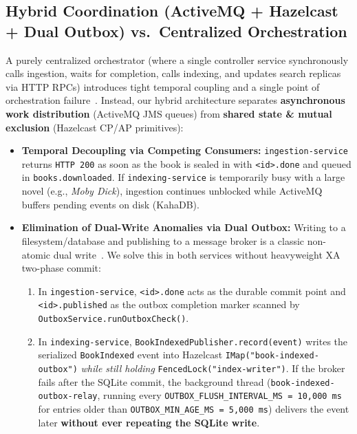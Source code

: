 \documentclass[10pt,a4paper]{article}
\begin{document}
\subsection{Hybrid Coordination (ActiveMQ + Hazelcast + Dual Outbox) vs.\ Centralized Orchestration}
A purely centralized orchestrator (where a single controller service synchronously calls ingestion, waits for completion, calls indexing, and updates search replicas via HTTP RPCs) introduces tight temporal coupling and a single point of orchestration failure~\cite{microservices_richardson}. Instead, our hybrid architecture separates \textbf{asynchronous work distribution} (ActiveMQ JMS queues) from \textbf{shared state \& mutual exclusion} (Hazelcast CP/AP primitives):
\begin{itemize}[leftmargin=*,nosep]
    \item \textbf{Temporal Decoupling via Competing Consumers:} \texttt{ingestion-service} returns \texttt{HTTP 200} as soon as the book is sealed in  with \texttt{<id>.done} and queued in \texttt{books.downloaded}. If \texttt{indexing-service} is temporarily busy with a large novel (e.g., \emph{Moby Dick}), ingestion continues unblocked while ActiveMQ buffers pending events on disk (KahaDB).
    \item \textbf{Elimination of Dual-Write Anomalies via Dual Outbox:} Writing to a filesystem/database and publishing to a message broker is a classic non-atomic dual write~\cite{kleppmann_ddia}. We solve this in both services without heavyweight XA two-phase commit:
    \begin{enumerate}[nosep]
        \item In \texttt{ingestion-service}, \texttt{<id>.done} acts as the durable commit point and \texttt{<id>.published} as the outbox completion marker scanned by \texttt{OutboxService.runOutboxCheck()}.
        \item In \texttt{indexing-service}, \texttt{BookIndexedPublisher.record(event)} writes the serialized \texttt{BookIndexed} event into Hazelcast \texttt{IMap("book-indexed-outbox")} \emph{while still holding} \texttt{FencedLock("index-writer")}. If the broker fails after the SQLite commit, the background thread (\texttt{book-indexed-outbox-relay}, running every \texttt{OUTBOX\_FLUSH\_INTERVAL\_MS = 10,000 ms} for entries older than \texttt{OUTBOX\_MIN\_AGE\_MS = 5,000 ms}) delivers the event later \textbf{without ever repeating the SQLite write}.
    \end{enumerate}
\end{itemize}
\end{document}
